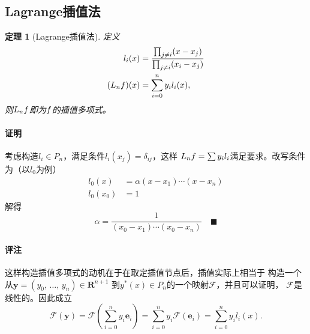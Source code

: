 \documentclass[12pt, a4paper]{article}
\theoremstyle{margin}
\newtheorem{thm}{定理}
\newcommand{\ms}{\mathscr}
\newcommand{\mbf}{\mathbf}
\newcommand{\f}{\mathnormal{f}}
\newcommand{\R}{\mathbf{R}}
\newcommand{\vep}{\varepsilon}
\newcommand{\remark}{\paragraph{评注}}
\newcommand{\proof}{\paragraph{证明}}
\begin{document}
  \iffalse
    给定一个函数$y = y(x)$在$[a, b]$中的点$x_0<\cdots<x_n$相应的函数值
    $y(x_i)$，设法重构函数$y = y(x)$。\footnote{从系统论的观点出发，
    即：已知映射$K$的一系列输入输出对，如何重构该映射$K$。}\par
    一般情况下解不唯一。所以设$y = y(x)$位于某一函数内，此时可能存在唯一解。
    例如，设$y(x)\in P_n$，则只需知道$n+1$个点的函数值，即可有唯一解。
      或者设输出$y_i$有测量误差。
      \[
      \widetilde{y}_i = \f(x_i) + \vep_i
      \]
      其中$\vep_i$为误差。
      \[
      y = \f(x) + \vep
      \]
      其中$\vep$正态分布。根据极大似然估计，等价于最小二乘解，
      （输出最小二乘法）
      \[
      \min_{y\in\pi} \sum_{i=0}^n|y_i - y(x_i)|^2
      \]
      其中$\pi$为某一个函数，有两种情况，
      \begin{enumerate}
      \item $\pi$由物理或化学规律确定；（基于机理建模）
      \item $\pi$由数据决定。（基于数据建模）
      \end{enumerate}
      （求关于权重和阈值的优化问题）；（非线性最小二乘解）。

    \paragraph{系统论的观点}
  \fi

\subsection{Lagrange插值法}
  \begin{thm}[Lagrange插值法]
    \label{thm: Lagrange插值法}
    定义
    \[\begin{split}
      l_i(x) &= \frac{\prod_{j\ne i}(x - x_j)}{\prod_{j\ne i}(x_i - x_j)} \\
      (L_n\f)(x) &= \sum_{i=0}^ny_il_i(x),
    \end{split}\]
    则$L_n\f$即为$\f$的插值多项式。
  \end{thm}
  \proof
    考虑构造$l_i\in P_n$，满足条件$l_i(x_j) = \delta_{ij}$，这样
    $L_n\f=\sum y_il_i$满足要求。改写条件为（以$l_0$为例）
    \[\begin{split}
      l_0(x) &= \alpha(x-x_1)\cdots(x-x_n) \\
      l_0(x_0) &= 1
    \end{split}\]
    解得
    \[
      \alpha = \frac{1}{(x_0-x_1)\cdots(x_0-x_n)}\quad\blacksquare
    \]
  \remark
    这样构造插值多项式的动机在于在取定插值节点后，插值实际上相当于
    构造一个从$\mbf{y}=(y_0,\,\dots,\,y_n)\in\R^{n+1}$
    到$y^*(x)\in P_n$的一个映射$\ms{F}$，并且可以证明，
    $\ms{F}$是线性的。因此成立
    \[
      \ms{F}(\mbf{y}) = \ms{F}(\sum_{i=0}^ny_i\mbf{e}_i)
       = \sum_{i=0}^ny_i\ms{F}(\mbf{e}_i)
       = \sum_{i=0}^ny_i l_i(x).
    \]
\end{document}
